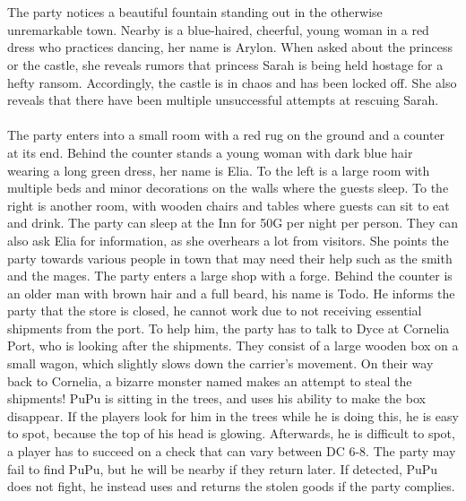 %
\clearpage
%
\\\\
%
 The party notices a beautiful fountain standing out in the otherwise unremarkable town.
Nearby is a blue-haired, cheerful, young woman in a red dress who practices dancing, her name is Arylon.
When asked about the princess or the castle, she reveals rumors that princess Sarah is being held hostage for a hefty ransom.
Accordingly, the castle is in chaos and has been locked off.
She also reveals that there have been multiple unsuccessful attempts at rescuing Sarah.
%
\vfill
%
\\\\
%
 The party enters into a small room with a red rug on the ground and a counter at its end.
Behind the counter stands a young woman with dark blue hair wearing a long green dress, her name is Elia.
To the left is a large room with multiple beds and minor decorations on the walls where the guests sleep.
To the right is another room, with wooden chairs and tables where guests can sit to eat and drink.
The party can sleep at the Inn for 50G per night per person.  
They can also ask Elia for information, as she overhears a lot from visitors.
She points the party towards various people in town that may need their help such as the smith and the mages.
%
\vfill
%
 The party enters a large shop with a forge.
Behind the counter is an older man with brown hair and a full beard, his name is Todo.
He informs the party that the store is closed, he cannot work due to not receiving essential shipments from the port.
To help him, the party has to talk to Dyce at Cornelia Port, who is looking after the shipments. 
They consist of a large wooden box on a small wagon, which slightly slows down the carrier's movement.
On their way back to Cornelia, a bizarre monster named  makes an attempt to steal the shipments!
PuPu is sitting in the trees, and uses his  ability to make the box disappear. 
If the players look for him in the trees while he is doing this, he is easy to spot, because the top of his head is glowing.
Afterwards, he is difficult to spot, a player has to succeed on a check that can vary between DC 6-8.
The party may fail to find PuPu, but he will be nearby if they return later.
If detected, PuPu does not fight, he instead uses  and returns the stolen goods if the party complies.
